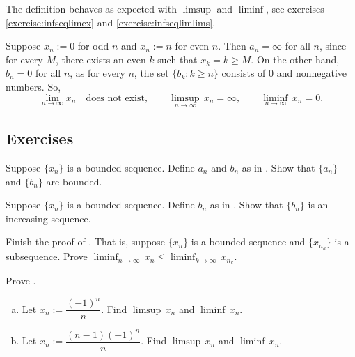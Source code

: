The definition behaves as expected with
$\limsup$ and $\liminf$, see exercises \ref{exercise:infseqlimex}
and \ref{exercise:infseqlimlims}.

\begin{example}
Suppose 
$x_n := 0$ for odd $n$ and $x_n := n$ for even $n$.
Then $a_n = \infty$ for all $n$, since for every $M$,
there exists an even $k$ such that $x_k = k \geq M$.
On the other hand, $b_n = 0$ for all $n$, as
for every $n$, the set
$\{ b_k : k \geq n \}$ consists of $0$ and nonnegative numbers.
So,
\begin{equation*}
\lim_{n\to \infty} x_n \quad \text{does not exist},
\qquad 
\limsup_{n\to \infty} \, x_n = \infty ,
\qquad 
\liminf_{n\to \infty} \, x_n = 0.
\end{equation*}
\end{example}

\subsection{Exercises}

\begin{exercise}
Suppose $\{ x_n \}$ is a bounded sequence.  Define $a_n$ and
$b_n$ as in .  Show that $\{ a_n \}$
and $\{ b_n \}$ are bounded.
\end{exercise}

\begin{exercise}
Suppose $\{ x_n \}$ is a bounded sequence.
Define $b_n$ as in .  Show that
$\{ b_n \}$ is an increasing sequence.
\end{exercise}

\begin{exercise}
Finish the proof of .  That is,
suppose $\{ x_n \}$ is a bounded sequence and
$\{ x_{n_k} \}$ is a subsequence.  Prove
$\displaystyle \liminf_{n\to\infty}\, x_n \leq
\liminf_{k\to\infty}\, x_{n_k}$.
\end{exercise}

\begin{exercise}
Prove .
\end{exercise}

\begin{exercise}
\leavevmode
\begin{enumerate}[a)]
\item
Let $x_n := \dfrac{{(-1)}^n}{n}$.
Find $\limsup \, x_n$ and $\liminf \, x_n$.
\item
Let $x_n := \dfrac{(n-1){(-1)}^n}{n}$.
Find $\limsup \, x_n$ and $\liminf \, x_n$.
\end{enumerate}
\end{exercise}

